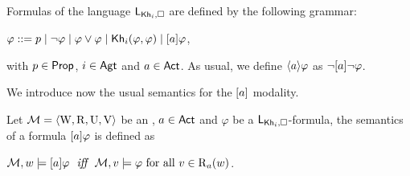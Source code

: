 \medskip

\begin{definition}\label{def:khimlsyntax}
Formulas of the language $\mathsf{L}_{{\sf Kh}_i,\square}$ are defined by the following grammar:
\begin{spcenter}
$\varphi ::= p \mid \neg\varphi \mid \varphi\vee\varphi \mid {\sf Kh}_i(\varphi,\varphi) \mid [a]\varphi$,
\end{spcenter}
with $p \in {\rm \sf Prop}$, $i \in {\rm \sf Agt}$ and $a \in {\rm \sf Act}$.
As usual, we define $\langle a \rangle\varphi$ as $\neg[a]\neg\varphi$. %
\end{definition}

\medskip

We introduce now the usual semantics for the $[a]$ modality.

\medskip

\begin{definition}\label{def:khimlsemantics}
Let $\mathcal{M} = \langle \operatorname{W}, \operatorname{R}, \operatorname{U}, \operatorname{V} \rangle$ be an \ults, $a \in {\rm \sf Act}$ and $\varphi$ be a $\mathsf{L}_{{\sf Kh}_i,\square}$-formula, the semantics of a formula $[a]\varphi$ is defined as
\begin{spcenter}
$\modults,w \models \mlbox{a}\varphi \ \ \iff \ \ \modults,v \models \varphi \mbox{ for all }v \in \R_a(w)$.
\end{spcenter}
\end{definition}
